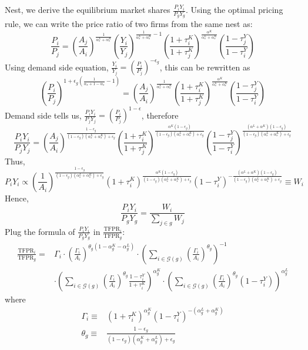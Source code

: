 \documentclass[12pt]{article}
\begin{document}
Nest, we derive the equilibrium market shares $\frac{P_iY_i}{P_gY_g}$. Using the optimal pricing rule, we can write the price ratio of two firms from the same nest as:
$$\frac{P_i}{P_j}=\left( \frac{A_j}{A_i} \right)^{\frac{1}{\alpha^L_s+\alpha^K_s}}\left( \frac{Y_i}{Y_j} \right)^{\frac{1}{\alpha^L_s+\alpha^K_s}-1}\left( \frac{1+\tau_i^K}{1+\tau_j^K} \right)^{\frac{\alpha^K}{\alpha^L_s+\alpha^K_s}}\left( \frac{1-\tau_j^Y}{1-\tau_i^Y} \right)$$
Using demand side equation, $\frac{Y_i}{Y_j}=\left( \frac{P_i}{P_j} \right)^{-\epsilon_g}$, this can be rewritten as 
$$\left( \frac{P_i}{P_j} \right)^{1+\epsilon_g\left(\frac{1}{\alpha_s+1-\alpha_s}-1\right)}=\left( \frac{A_j}{A_i} \right)^{\frac{1}{\alpha^L_s+\alpha^K_s}}\left( \frac{1+\tau_i^K}{1+\tau_j^K} \right)^{\frac{\alpha^K}{\alpha^L_s+\alpha^K_s}}\left( \frac{1-\tau_j^Y}{1-\tau_i^Y} \right)$$
Demand side tells us, $\frac{P_iY_i}{P_jY_j}=\left( \frac{P_i}{P_j} \right)^{1-\epsilon}$, therefore
$$\frac{P_iY_i}{P_jY_j}=\left( \frac{A_j}{A_i} \right)^{\frac{1-\epsilon_g}{(1-\epsilon_g)(\alpha^L_s+\alpha^K_s)+\epsilon_g}}\left( \frac{1+\tau_i^K}{1+\tau_j^K} \right)^{\frac{\alpha^K(1-\epsilon_g)}{(1-\epsilon_g)(\alpha^L_s+\alpha^K_s)+\epsilon_g}}\left( \frac{1-\tau_j^Y}{1-\tau_i^Y} \right)^{\frac{(\alpha^L+\alpha^K)(1-\epsilon_g)}{(1-\epsilon_g)(\alpha^L_s+\alpha^K_s)+\epsilon_g}}$$
Thus,
$$P_iY_i \propto \left( \frac{1}{A_i}\right)^{\frac{1-\epsilon_g}{(1-\epsilon_g)(\alpha^L_s+\alpha^K_s)+\epsilon_g}} (1+\tau_i^K)^{\frac{\alpha^K(1-\epsilon_g)}{(1-\epsilon_g)(\alpha^L_s+\alpha^K_s)+\epsilon_g}}(1-\tau_i^Y)^{-\frac{(\alpha^L+\alpha^K)(1-\epsilon_g)}{(1-\epsilon_g)(\alpha^L_s+\alpha^K_s)+\epsilon_g}} \equiv W_i$$
Hence,
$$\frac{P_iY_i}{P_gY_g}=\frac{W_i}{\sum_{j\in g}W_j}$$
Plug the formula of $\frac{P_iY_i}{P_gY_g}$ in $\frac{\text{TFPR}_i}{\text{TFPR}_g}$:
\begin{align}
\frac{\text{TFPR}_i}{\text{TFPR}_g}=&\Gamma_i\cdot \left( \frac{\Gamma_i}{A_i} \right)^{\theta_g(1-\alpha_g^K-\alpha_g^L)} \cdot \left( \sum_{i\in\mathcal{G}(g)} \left( \frac{\Gamma_i}{A_i} \right)^{\theta_g}\right)^{-1} \nonumber\\
&\cdot \left( \sum_{i\in\mathcal{G}(g)} \left( \frac{\Gamma_i}{A_i} \right)^{\theta_g}\frac{1-\tau_i^Y}{1+\tau_i^K}\right)^{\alpha_g^K} \cdot \left( \sum_{i\in\mathcal{G}(g)} \left( \frac{\Gamma_i}{A_i} \right)^{\theta_g}(1-\tau_i^Y)\right)^{\alpha_g^L} \label{AEq:TFPRratio}
\end{align}
where
\begin{align*}
\Gamma_i\equiv & (1+\tau_i^K)^{\alpha_g^K}(1-\tau_i^Y)^{-(\alpha_g^L+\alpha_g^K)}\\
\theta_g\equiv & \frac{1-\epsilon_g}{(1-\epsilon_g)(\alpha_g^K+\alpha_g^L)+\epsilon_g}
\end{align*}
\end{document}
